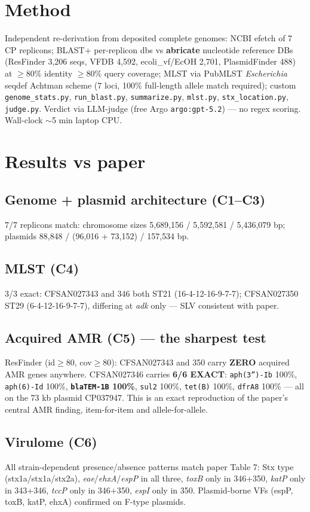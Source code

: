 \documentclass[11pt]{article}
\begin{document}
\section{Method}
Independent re-derivation from deposited complete genomes: NCBI efetch of 7 CP replicons;
BLAST+ per-replicon dbs vs \textbf{abricate} nucleotide reference DBs (ResFinder 3{,}206
seqs, VFDB 4{,}592, ecoli\_vf/EcOH 2{,}701, PlasmidFinder 488) at $\geq 80\%$ identity $\geq 80\%$
query coverage; MLST via PubMLST \textit{Escherichia} seqdef Achtman scheme (7 loci,
100\% full-length allele match required); custom \texttt{genome\_stats.py},
\texttt{run\_blast.py}, \texttt{summarize.py}, \texttt{mlst.py}, \texttt{stx\_location.py},
\texttt{judge.py}. Verdict via LLM-judge (free Argo \texttt{argo:gpt-5.2}) --- no regex scoring.
Wall-clock $\sim$5 min laptop CPU.

\section{Results vs paper}
\subsection*{Genome + plasmid architecture (C1--C3)}
7/7 replicons match: chromosome sizes 5{,}689{,}156 / 5{,}592{,}581 / 5{,}436{,}079 bp;
plasmids 88{,}848 / (96{,}016 + 73{,}152) / 157{,}534 bp.

\subsection*{MLST (C4)}
3/3 exact: CFSAN027343 and 346 both ST21 (16-4-12-16-9-7-7); CFSAN027350 ST29
(6-4-12-16-9-7-7), differing at \textit{adk} only --- SLV consistent with paper.

\subsection*{Acquired AMR (C5) --- the sharpest test}
ResFinder (id$\geq$80, cov$\geq$80): CFSAN027343 and 350 carry \textbf{ZERO} acquired AMR
genes anywhere. CFSAN027346 carries \textbf{6/6 EXACT}: \texttt{aph(3'')-Ib} 100\%,
\texttt{aph(6)-Id} 100\%, \textbf{\texttt{blaTEM-1B} 100\%}, \texttt{sul2} 100\%,
\texttt{tet(B)} 100\%, \texttt{dfrA8} 100\% --- all on the 73 kb plasmid CP037947. This is
an exact reproduction of the paper's central AMR finding, item-for-item and allele-for-allele.

\subsection*{Virulome (C6)}
All strain-dependent presence/absence patterns match paper Table 7: Stx type
(stx1a/stx1a/stx2a), \textit{eae}/\textit{ehxA}/\textit{espP} in all three, \textit{toxB}
only in 346+350, \textit{katP} only in 343+346, \textit{tccP} only in 346+350, \textit{espI}
only in 350. Plasmid-borne VFs (espP, toxB, katP, ehxA) confirmed on F-type plasmids.
\end{document}
